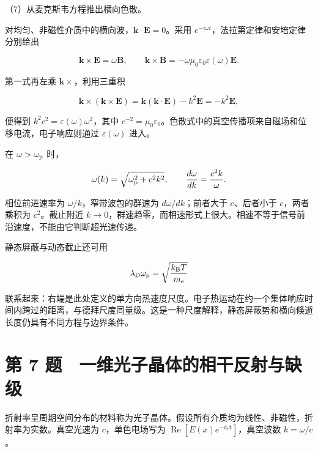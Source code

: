 \documentclass[12pt,a4paper,fontset=fandol]{ctexart}
\begin{document}
\par\noindent\begin{minipage}{\linewidth}
\setlength{\parindent}{2em}\setlength{\parskip}{.35em}
（7）从麦克斯韦方程推出横向色散。

对均匀、非磁性介质中的横向波，\(\boldsymbol k\cdot\boldsymbol E=0\)。采用
\(e^{-i\omega t}\)，法拉第定律和安培定律分别给出

\[
\boldsymbol k\times\boldsymbol E=\omega\boldsymbol B,\qquad
\boldsymbol k\times\boldsymbol B
=-\omega\mu_0\varepsilon_0\varepsilon(\omega)\boldsymbol E.
\]

第一式再左乘 \(\boldsymbol k\times\)，利用三重积

\[
\boldsymbol k\times(\boldsymbol k\times\boldsymbol E)
=\boldsymbol k(\boldsymbol k\cdot\boldsymbol E)-k^2\boldsymbol E
=-k^2\boldsymbol E,
\]

便得到 \(k^2c^2=\varepsilon(\omega)\omega^2\)，其中
\(c^{-2}=\mu_0\varepsilon_0\)。色散式中的真空传播项来自磁场和位移电流，电子响应则通过
\(\varepsilon(\omega)\) 进入。

在 \(\omega>\omega_{\rm p}\) 时，

\[
\omega(k)=\sqrt{\omega_{\rm p}^2+c^2k^2},\qquad
\frac{d\omega}{dk}=\frac{c^2k}{\omega}.
\]

相位前进速率为 \(\omega/k\)，窄带波包的群速为 \(d\omega/dk\)；前者大于
\(c\)、后者小于 \(c\)，两者乘积为 \(c^2\)。截止附近
\(k\to0\)，群速趋零，而相速形式上很大。相速不等于信号前沿速度，不能由它判断超光速传递。

静态屏蔽与动态截止还可用

\[
\lambda_{\rm D}\omega_{\rm p}
=\sqrt{\frac{k_{\rm B}T}{m_{\rm e}}}
\]

联系起来：右端是此处定义的单方向热速度尺度。电子热运动在约一个集体响应时间内跨过的距离，与德拜尺度同量级。这是一种尺度解释，静态屏蔽势和横向倏逝长度仍具有不同方程与边界条件。


\end{minipage}\par
\clearpage

\section{第 7
题　一维光子晶体的相干反射与缺级}\label{ux7b2c-7-ux9898-ux4e00ux7ef4ux5149ux5b50ux6676ux4f53ux7684ux76f8ux5e72ux53cdux5c04ux4e0eux7f3aux7ea7}

折射率呈周期空间分布的材料称为光子晶体。假设所有介质均为线性、非磁性，折射率为实数。真空光速为
\(c\)，单色电场写为 \(\operatorname{Re}[E(x)e^{-i\omega t}]\)，真空波数
\(k=\omega/c\)。
\end{document}
